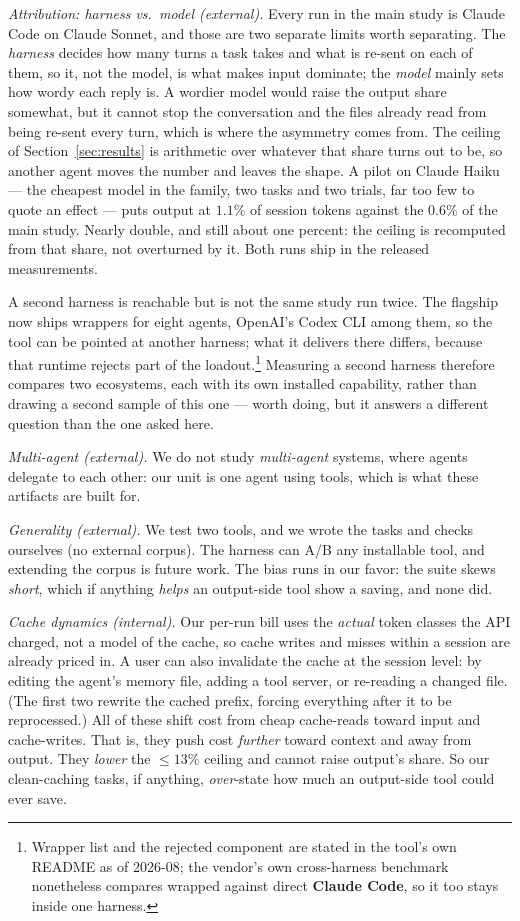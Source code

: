 \emph{Attribution: harness vs.\ model (external).} Every run in the main study is Claude Code on Claude Sonnet, and those
are two separate limits worth separating. The \emph{harness} decides how many turns a task takes and
what is re-sent on each of them, so it, not the model, is what makes input dominate; the \emph{model}
mainly sets how wordy each reply is. A wordier model would raise the output share somewhat, but it
cannot stop the conversation and the files already read from being re-sent every turn, which is where
the asymmetry comes from. The ceiling of Section~\ref{sec:results} is arithmetic over whatever that
share turns out to be, so another agent moves the number and leaves the shape. A pilot on Claude
Haiku --- the cheapest model in the family, two tasks and two trials, far too few to quote an
effect --- puts output at $1.1\%$ of session tokens against the $0.6\%$ of the main study.
Nearly double, and still about one percent: the ceiling is recomputed from that share, not overturned
by it. Both runs ship in the released measurements.

A second harness is reachable but is not the same study run twice. The flagship now ships wrappers
for eight agents, OpenAI's Codex CLI among them, so the tool can be pointed at another harness; what
it delivers there differs, because that runtime rejects part of the loadout.\footnote{Wrapper list
and the rejected component are stated in the tool's own README as of 2026-08; the vendor's own
cross-harness benchmark nonetheless compares wrapped against direct \textbf{Claude Code}, so it too
stays inside one harness.} Measuring a second harness therefore compares two ecosystems, each with
its own installed capability, rather than drawing a second sample of this one --- worth doing, but it
answers a different question than the one asked here.

\emph{Multi-agent (external).} We do not study \emph{multi-agent} systems, where agents delegate to each
other: our unit is one agent using tools, which is what these artifacts are built for.

\emph{Generality (external).} We test two tools, and we wrote the tasks and checks ourselves (no external corpus).
The harness can A/B any installable tool, and extending the corpus is future work. The bias runs in our
favor: the suite skews \emph{short}, which if anything \emph{helps} an output-side tool show a saving,
and none did.

\emph{Cache dynamics (internal).} Our per-run bill uses the \emph{actual} token classes the API charged, not a
model of the cache, so cache writes and misses within a session are already priced in. A user can also
invalidate the cache at the session level: by editing the agent's memory file, adding a tool
server, or re-reading a changed file. (The first two rewrite the cached prefix, forcing everything after
it to be reprocessed.) All of these shift cost from cheap cache-reads toward input and cache-writes.
That is, they push cost \emph{further} toward context and away from output. They \emph{lower} the
${\le}13\%$ ceiling and cannot raise output's share. So our clean-caching tasks, if anything,
\emph{over}-state how much an output-side tool could ever save.

